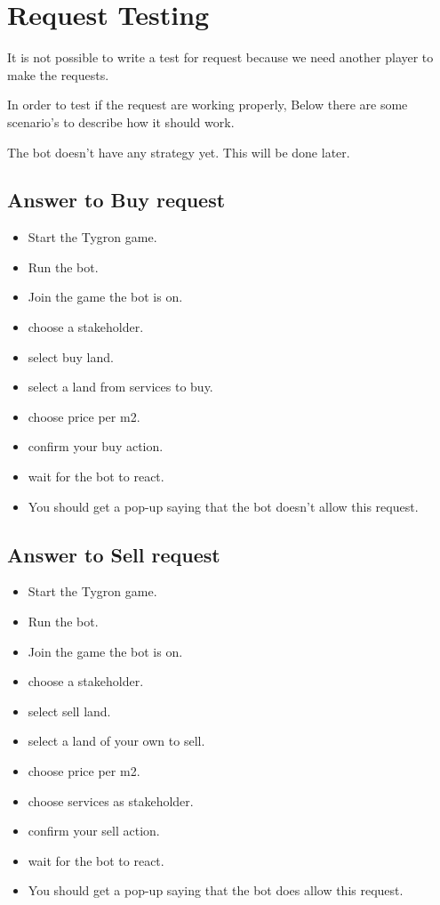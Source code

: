 \documentclass[]{article}
\begin{document}
	
\section{Request Testing}
It is not possible to write a test for request because we need another player to make the requests.

In order to test if the request are working properly, Below there  are some scenario's to describe how it should work.

The bot doesn't have any strategy yet. This will be done later.

\subsection{Answer to Buy request}
\begin{itemize}
	\item Start the Tygron game.
	\item Run the bot.
	\item Join the game the bot is on.
	\item choose a stakeholder.
	\item select buy land.
	\item select a land from services to buy.
	\item choose price per m2.
	\item confirm your buy action.
	\item wait for the bot to react.
	\item You should get a pop-up saying that the bot doesn't allow this request.
\end{itemize}



\subsection{Answer to Sell request}
\begin{itemize}
	\item Start the Tygron game.
	\item Run the bot.
	\item Join the game the bot is on.
	\item choose a stakeholder.
	\item select sell land.
	\item select a land of your own to sell.
	\item choose price per m2.
	\item choose services as stakeholder.
	\item confirm your sell action.
	\item wait for the bot to react.
	\item You should get a pop-up saying that the bot does allow this request.
\end{itemize}
\end{document}
